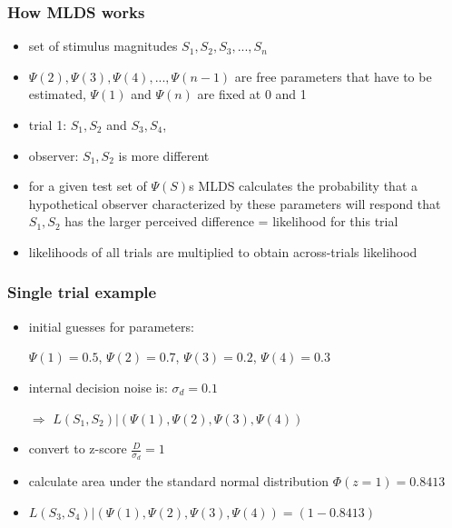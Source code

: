 \documentclass[]{beamer}
\begin{document}
\begin{frame}
 \frametitle{How MLDS works}
\begin{itemize}
 \item set of stimulus magnitudes $S_1, S_2, S_3, ..., S_n$
 \item $\Psi(2), \Psi(3), \Psi(4), ..., \Psi(n-1)$ are free parameters that have to be estimated, $\Psi(1)$ and $\Psi(n)$ are fixed at 0 and 1
 \item[]
 \item<2-> trial 1: $S_1,S_2$ and $S_3,S_4$, 
 \item<2-> observer: $S_1,S_2$ is more different 
 \item<2-> for a given test set of $\Psi(S)$s MLDS calculates the probability that a hypothetical observer characterized by these parameters will respond that $S_1,S_2$ has the larger perceived difference = likelihood for this trial
 \item[] 
 \item<3-> likelihoods of all trials are multiplied to obtain across-trials likelihood
\end{itemize}
\end{frame}


\begin{frame}
 \frametitle{Single trial example}
\begin{overlayarea}{120mm}{80mm}
\begin{itemize}
 \item initial guesses for parameters:
 \item[] $\Psi(1)=0.5$, $\Psi(2)=0.7$, $\Psi(3)=0.2$, $\Psi(4)=0.3$ 
 \item internal decision noise is: $\sigma_d=0.1$
 \item[]
 \item[$\Rightarrow$] $L(S_1,S_2)|(\Psi(1),\Psi(2),\Psi(3),\Psi(4))$
 \item[]
\end{itemize}
\begin{itemize}
\item[] 
\item<3-> convert to z-score $\frac{D}{\sigma_d} = 1$
 \item<3-> calculate area under the standard normal distribution $\Phi(z=1)=0.8413$
 \item[]
 \item<4->[$\Rightarrow$] $L(S_3,S_4)|(\Psi(1),\Psi(2),\Psi(3),\Psi(4)) = (1-0.8413)$
\end{itemize}
\end{overlayarea}
\end{frame}
\end{document}
